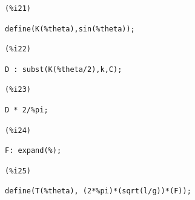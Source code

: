 \documentclass[12pt]{article}
\begin{document}
\noindent
\begin{minipage}[t]{8ex}{\color{red}\bf
\begin{verbatim}
(%i21) 
\end{verbatim}}
\end{minipage}
\begin{minipage}[t]{\textwidth}{\color{blue}
\begin{verbatim}
define(K(%theta),sin(%theta));
\end{verbatim}}
\end{minipage}

\noindent
\begin{minipage}[t]{8ex}{\color{red}\bf
\begin{verbatim}
(%i22) 
\end{verbatim}}
\end{minipage}
\begin{minipage}[t]{\textwidth}{\color{blue}
\begin{verbatim}
D : subst(K(%theta/2),k,C);
\end{verbatim}}
\end{minipage}

\noindent
\begin{minipage}[t]{8ex}{\color{red}\bf
\begin{verbatim}
(%i23) 
\end{verbatim}}
\end{minipage}
\begin{minipage}[t]{\textwidth}{\color{blue}
\begin{verbatim}
D * 2/%pi;
\end{verbatim}}
\end{minipage}

\noindent
\begin{minipage}[t]{8ex}{\color{red}\bf
\begin{verbatim}
(%i24) 
\end{verbatim}}
\end{minipage}
\begin{minipage}[t]{\textwidth}{\color{blue}
\begin{verbatim}
F: expand(%);
\end{verbatim}}
\end{minipage}

\noindent
\begin{minipage}[t]{8ex}{\color{red}\bf
\begin{verbatim}
(%i25) 
\end{verbatim}}
\end{minipage}
\begin{minipage}[t]{\textwidth}{\color{blue}
\begin{verbatim}
define(T(%theta), (2*%pi)*(sqrt(l/g))*(F));
\end{verbatim}}
\end{minipage}
\end{document}
